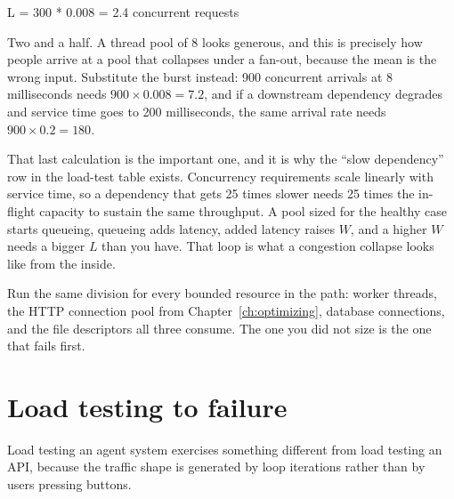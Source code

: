 \begin{plain}
L = 300 * 0.008 = 2.4 concurrent requests
\end{plain}

Two and a half. A thread pool of 8 looks generous, and this is precisely how
people arrive at a pool that collapses under a fan-out, because the mean is the
wrong input. Substitute the burst instead: 900 concurrent arrivals at 8
milliseconds needs $900 \times 0.008 = 7.2$, and if a downstream dependency
degrades and service time goes to 200 milliseconds, the same arrival rate needs
$900 \times 0.2 = 180$.

That last calculation is the important one, and it is why the ``slow dependency''
row in the load-test table exists. Concurrency requirements scale linearly with
service time, so a dependency that gets 25 times slower needs 25 times the
in-flight capacity to sustain the same throughput. A pool sized for the healthy
case starts queueing, queueing adds latency, added latency raises $W$, and a
higher $W$ needs a bigger $L$ than you have. That loop is what a congestion
collapse looks like from the inside.

Run the same division for every bounded resource in the path: worker threads,
the HTTP connection pool from Chapter~\ref{ch:optimizing}, database connections,
and the file descriptors all three consume. The one you did not size is the one
that fails first.


\section{Load testing to failure}

Load testing an agent system exercises something different from load testing an
API, because the traffic shape is generated by loop iterations rather than by
users pressing buttons.

